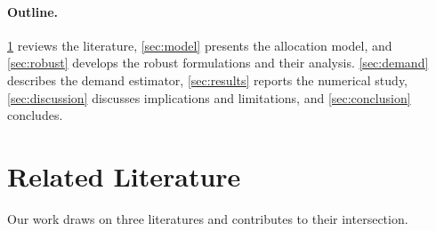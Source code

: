 \documentclass[11pt]{article}
\begin{document}
\paragraph{Outline.}
\Sec\ref{sec:related} reviews the literature, \Sec\ref{sec:model} presents the allocation model, and \Sec\ref{sec:robust} develops the robust formulations and their analysis.
\Sec\ref{sec:demand} describes the demand estimator, \Sec\ref{sec:results} reports the numerical study, \Sec\ref{sec:discussion} discusses implications and limitations, and \Sec\ref{sec:conclusion} concludes.

\section{Related Literature}
\label{sec:related}

Our work draws on three literatures and contributes to their intersection.
\end{document}
